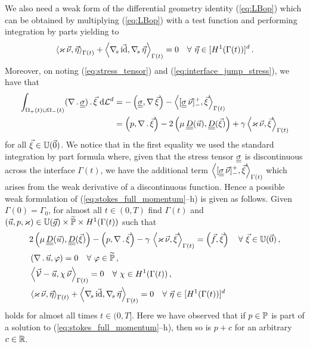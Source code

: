 We also need a weak form of the differential geometry identity
(\ref{eq:LBop}) which can be obtained by multiplying (\ref{eq:LBop}) with a
test function and performing integration by parts yielding to
$$
\left\langle \varkappa\,\vec\nu, \vec\eta \right\rangle_{\Gamma(t)}
+ \left\langle \nabla_{\!s}\,\vec {\rm id}, \nabla_{\!s}\,\vec \eta \right\rangle_{\Gamma(t)}
= 0  \quad \forall\ \vec\eta \in [H^1(\Gamma(t))]^d\,.
$$
Moreover, on noting (\ref{eq:stress_tensor}) and
(\ref{eq:interface_jump_stress}), we have that
\begin{align*}
\int_{\Omega_+(t)\cup\Omega_-(t)} (\nabla\,.\,\mat\sigma)\,.\, \vec \xi \dL{d}
& = - \left(\mat\sigma, \nabla\,\vec \xi\right)
- \left\langle [\mat\sigma\,\vec\nu]_-^+ , \vec \xi
  \right\rangle_{\Gamma(t)} \nonumber \\
& = \left( p , \nabla\,.\,\vec \xi\right)
-2 \left(\mu\,\mat D(\vec u) , \mat D(\vec \xi) \right)
+ \gamma \left\langle \varkappa\,\vec \nu , \vec \xi  \right\rangle_{\Gamma(t)}
\end{align*}
for all $\vec \xi \in \mathbb{U}(\vec{0})$. We notice that in the first equality we used
the standard integration by part formula where, given that the stress tensor
$\mat\sigma$ is discontinuous across the interface $\Gamma(t)$, we have the
additional term $\left\langle [\mat\sigma\,\vec\nu]_-^+ , \vec \xi
\right\rangle_{\Gamma(t)}$ which arises from the weak derivative of a
discontinuous function. Hence a possible weak formulation of
(\ref{eq:stokes_full_momentum}--h) is given as follows.
\sloppy Given $\Gamma(0) = \Gamma_0$, for almost all $t\in(0,T)$ find
$\Gamma(t)$ and ${(\vec u, p, \varkappa) \in \mathbb{U}(\vec{g}) \times \widetilde{\mathbb{P}}
\times H^1(\Gamma(t))}$ such that
\begin{subequations}
\begin{align}
& 2\left(\mu\,\mat D(\vec u), \mat D(\vec \xi)\right)
- \left(p, \nabla\,.\,\vec \xi\right)
- \gamma\,\left\langle \varkappa\,\vec\nu, \vec\xi\right\rangle_{\Gamma(t)}
= \left(\vec f, \vec \xi\right)\quad \forall\ \vec\xi \in \uspace 0 \,,
\label{eq:stokes_weaka}\\
& \left(\nabla\,.\,\vec u, \varphi\right) = 0
\quad \forall\ \varphi \in \pnormspace\,, \label{eq:stokes_weakb} \\
&  \left\langle \V
- \vec u, \chi\,\vec\nu \right\rangle_{\Gamma(t)} = 0
\quad \forall\ \chi \in H^1(\Gamma(t))\,, \label{eq:stokes_weakc} \\
& \left\langle \varkappa\,\vec\nu, \vec\eta \right\rangle_{\Gamma(t)}
+ \left\langle \nabs\,\vec \id, \nabs\,\vec \eta \right\rangle_{\Gamma(t)}
= 0  \quad \forall\ \vec\eta \in [H^1(\Gamma(t))]^d\,\label{eq:stokes_weakd}
\end{align}
\end{subequations}
holds for almost all times $t \in (0,T]$. Here we have observed that if
$p \in \mathbb{P}$ is part of a solution to (\ref{eq:stokes_full_momentum}--h),
then so is $p + c$ for an arbitrary $c\in \mathbb R$.

